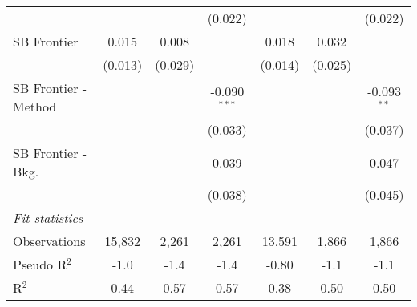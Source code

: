 \begin{tabular}{lcccccc}
                        &             &              & (0.022)        &              &         & (0.022)\\   
   SB Frontier          & 0.015       & 0.008        &                & 0.018        & 0.032   &   \\   
                        & (0.013)     & (0.029)      &                & (0.014)      & (0.025) &   \\   
   SB Frontier - Method &             &              & -0.090$^{***}$ &              &         & -0.093$^{**}$\\   
                        &             &              & (0.033)        &              &         & (0.037)\\   
   SB Frontier - Bkg.   &             &              & 0.039          &              &         & 0.047\\   
                        &             &              & (0.038)        &              &         & (0.045)\\   
   \midrule
   \emph{Fit statistics}\\
   Observations         & 15,832      & 2,261        & 2,261          & 13,591       & 1,866   & 1,866\\  
   Pseudo R$^2$         & -1.0        & -1.4         & -1.4           & -0.80        & -1.1    & -1.1\\  
   R$^2$                & 0.44        & 0.57         & 0.57           & 0.38         & 0.50    & 0.50\\  
   

\end{tabular}
